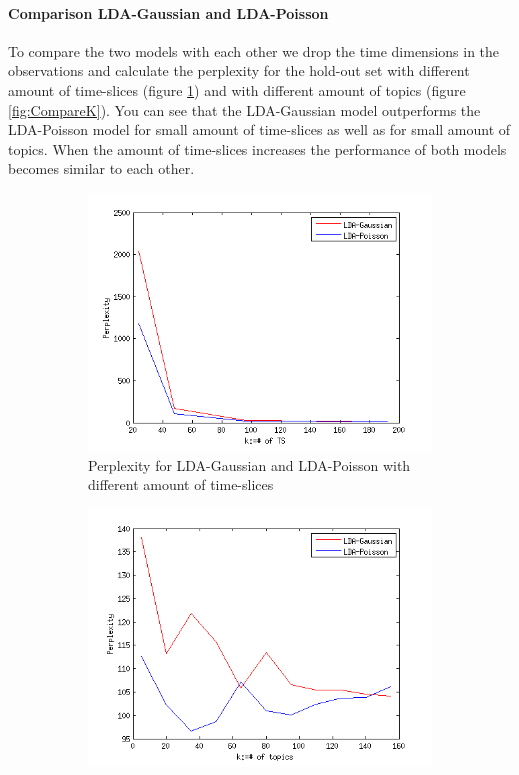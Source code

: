 \documentclass[11pt,a4paper]{article}
\begin{document}
\paragraph{Comparison LDA-Gaussian and LDA-Poisson}

To compare the two models with each other we drop the time dimensions in the observations and calculate the perplexity for the hold-out set with different amount of time-slices (figure \ref{fig:CompareTS}) and with different amount of topics (figure \ref{fig:CompareK}).
You can see that the LDA-Gaussian model outperforms the LDA-Poisson model for small amount of time-slices as well as for small amount of topics. When the amount of time-slices increases the performance of both models becomes similar to each other. 

\begin{figure}[h!]
 \centering
 \begin{subfigure}[b]{0.45\linewidth}
  \centering
  \includegraphics[width=\textwidth]{Pictures/CompareTSgausPois.png}
  \caption{Perplexity for LDA-Gaussian and LDA-Poisson with different amount of time-slices}
  \label{fig:CompareTS}
 \end{subfigure}
 \begin{subfigure}[b]{0.45\linewidth}
  \centering
  \includegraphics[width=\textwidth]{Pictures/CompareKgausPois.png}

\end{subfigure}
\end{figure}
\end{document}
